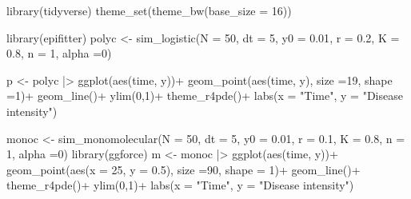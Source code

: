 \documentclass[
  letterpaper,
]{book}
\newenvironment{Shaded}{\begin{snugshade}}{\end{snugshade}}
\newcommand{\AttributeTok}[1]{\textcolor[rgb]{0.40,0.45,0.13}{#1}}
\newcommand{\DecValTok}[1]{\textcolor[rgb]{0.68,0.00,0.00}{#1}}
\newcommand{\FloatTok}[1]{\textcolor[rgb]{0.68,0.00,0.00}{#1}}
\newcommand{\FunctionTok}[1]{\textcolor[rgb]{0.28,0.35,0.67}{#1}}
\newcommand{\NormalTok}[1]{\textcolor[rgb]{0.00,0.23,0.31}{#1}}
\newcommand{\OtherTok}[1]{\textcolor[rgb]{0.00,0.23,0.31}{#1}}
\newcommand{\SpecialCharTok}[1]{\textcolor[rgb]{0.37,0.37,0.37}{#1}}
\newcommand{\StringTok}[1]{\textcolor[rgb]{0.13,0.47,0.30}{#1}}
\begin{document}
\begin{Shaded}
\begin{Highlighting}[]
\FunctionTok{library}\NormalTok{(tidyverse)}
\FunctionTok{theme\_set}\NormalTok{(}\FunctionTok{theme\_bw}\NormalTok{(}\AttributeTok{base\_size =} \DecValTok{16}\NormalTok{))}

\FunctionTok{library}\NormalTok{(epifitter)}
\NormalTok{polyc }\OtherTok{\textless{}{-}} \FunctionTok{sim\_logistic}\NormalTok{(}\AttributeTok{N =} \DecValTok{50}\NormalTok{, }\AttributeTok{dt =} \DecValTok{5}\NormalTok{, }
                      \AttributeTok{y0 =} \FloatTok{0.01}\NormalTok{, }\AttributeTok{r =} \FloatTok{0.2}\NormalTok{, }
                      \AttributeTok{K =} \FloatTok{0.8}\NormalTok{, }\AttributeTok{n =} \DecValTok{1}\NormalTok{, }
                      \AttributeTok{alpha =}\DecValTok{0}\NormalTok{)}

\NormalTok{p }\OtherTok{\textless{}{-}}\NormalTok{ polyc }\SpecialCharTok{|\textgreater{}} 
  \FunctionTok{ggplot}\NormalTok{(}\FunctionTok{aes}\NormalTok{(time, y))}\SpecialCharTok{+}
  \FunctionTok{geom\_point}\NormalTok{(}\FunctionTok{aes}\NormalTok{(time, y), }\AttributeTok{size =}\DecValTok{19}\NormalTok{, }\AttributeTok{shape =}\DecValTok{1}\NormalTok{)}\SpecialCharTok{+}
  \FunctionTok{geom\_line}\NormalTok{()}\SpecialCharTok{+}
  \FunctionTok{ylim}\NormalTok{(}\DecValTok{0}\NormalTok{,}\DecValTok{1}\NormalTok{)}\SpecialCharTok{+}
  \FunctionTok{theme\_r4pde}\NormalTok{()}\SpecialCharTok{+}
  \FunctionTok{labs}\NormalTok{(}\AttributeTok{x =} \StringTok{"Time"}\NormalTok{, }\AttributeTok{y =} \StringTok{"Disease intensity"}\NormalTok{)}


\NormalTok{monoc }\OtherTok{\textless{}{-}} \FunctionTok{sim\_monomolecular}\NormalTok{(}\AttributeTok{N =} \DecValTok{50}\NormalTok{, }\AttributeTok{dt =} \DecValTok{5}\NormalTok{, }
                           \AttributeTok{y0 =} \FloatTok{0.01}\NormalTok{, }\AttributeTok{r =} \FloatTok{0.1}\NormalTok{,}
                           \AttributeTok{K =} \FloatTok{0.8}\NormalTok{, }\AttributeTok{n =} \DecValTok{1}\NormalTok{, }
                           \AttributeTok{alpha =}\DecValTok{0}\NormalTok{)}
\FunctionTok{library}\NormalTok{(ggforce)}
\NormalTok{m }\OtherTok{\textless{}{-}}\NormalTok{ monoc }\SpecialCharTok{|\textgreater{}} 
  \FunctionTok{ggplot}\NormalTok{(}\FunctionTok{aes}\NormalTok{(time, y))}\SpecialCharTok{+}
  \FunctionTok{geom\_point}\NormalTok{(}\FunctionTok{aes}\NormalTok{(}\AttributeTok{x =} \DecValTok{25}\NormalTok{, }\AttributeTok{y =} \FloatTok{0.5}\NormalTok{), }\AttributeTok{size =}\DecValTok{90}\NormalTok{, }\AttributeTok{shape =} \DecValTok{1}\NormalTok{)}\SpecialCharTok{+}
   \FunctionTok{geom\_line}\NormalTok{()}\SpecialCharTok{+}
 \FunctionTok{theme\_r4pde}\NormalTok{()}\SpecialCharTok{+}
  \FunctionTok{ylim}\NormalTok{(}\DecValTok{0}\NormalTok{,}\DecValTok{1}\NormalTok{)}\SpecialCharTok{+}
  \FunctionTok{labs}\NormalTok{(}\AttributeTok{x =} \StringTok{"Time"}\NormalTok{, }\AttributeTok{y =} \StringTok{"Disease intensity"}\NormalTok{)}


\end{Highlighting}
\end{Shaded}
\end{document}
